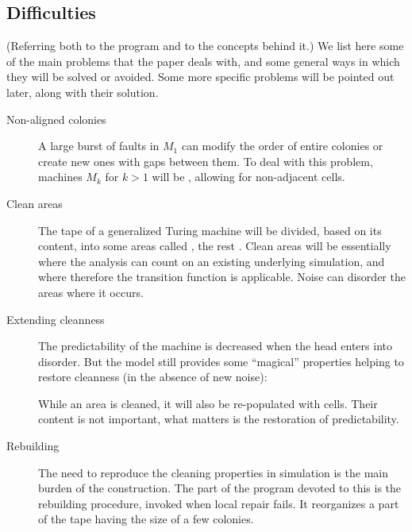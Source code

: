 \documentclass[11pt]{memoir}
\theoremstyle{definition} %
\begin{document}
\subsection{Difficulties}\label{sec:novelties}

(Referring both to the program and to the concepts behind it.)
We list here some of the main problems that the paper deals with, 
and some general ways in which they will be solved or avoided.
Some more specific problems will be pointed out later, along with their solution.

\begin{description}

\item[Non-aligned colonies] A large burst of faults in \( M_{1} \) can modify the order of
entire colonies or create new ones with gaps between them.
To deal with this problem, machines \( M_{k} \) for \( k>1 \)
will be , allowing for non-adjacent cells.

\item[Clean areas]
  The tape of a generalized Turing machine will be divided, based on its content, into
  some areas called , the rest .
  Clean areas will be essentially where the analysis
  can count on an existing underlying simulation,
  and where therefore the transition function is applicable.
  Noise can disorder the areas where it occurs.

\item[Extending cleanness]
  The predictability of the machine is decreased when the head enters into disorder.
  But the model still provides some ``magical'' properties
  helping to restore cleanness (in the absence of new noise):
While an area is cleaned, it will also be re-populated with cells.
Their content is not important, what matters is the restoration of predictability.

\item[Rebuilding]
The need to reproduce the cleaning properties in simulation is the
main burden of the construction.
The part of the program devoted to this is the rebuilding procedure,
invoked when local repair fails.
  It reorganizes a part of the tape having the size of a few colonies.
\end{description}
\end{document}
